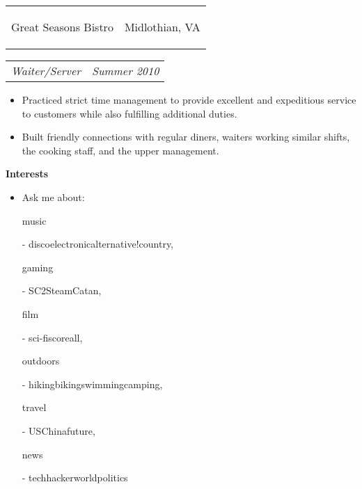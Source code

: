 \documentclass[11pt]{article}
\makeatletter
\newcommand{\headerrow}[2]
{\begin{tabular*}{\linewidth}{l@{\extracolsep{\fill}}r}
	#1 &
	#2 \\
\end{tabular*}}
\makeatother
\begin{document}
\vspace{-0.5em}

\headerrow
	{\begin{Large}Great Seasons Bistro\end{Large}}
	{Midlothian, VA}
\headerrow
	{\textit{Waiter/Server}}
	{\textit{Summer 2010}}
	
\vspace{-0.8em}
\begin{itemize}
	\item Practiced strict time management to provide excellent and expeditious service to customers while also fulfilling additional duties.
	\vspace{-0.5em}
	\item Built friendly connections with regular diners, waiters working similar shifts, the cooking staff, and the upper management.
\end{itemize}

\vspace{-0.3em}

\begin{LARGE}
	\bf Interests
\end{LARGE}

\vspace{-0.5em}

\begin{itemize}
	\item Ask me about: \begin{bf}music\end{bf} - disco\textbar electronic\textbar alternative\textbar !country, \begin{bf}gaming\end{bf} - SC2\textbar Steam\textbar Catan, \begin{bf}film\end{bf} - sci-fi\textbar score\textbar all, \begin{bf}outdoors\end{bf} - hiking\textbar biking\textbar swimming\textbar camping, \begin{bf}travel\end{bf} - US\textbar China\textbar future, \begin{bf}news\end{bf} - tech\textbar hacker\textbar world\textbar politics
\end{itemize}
\end{document}
